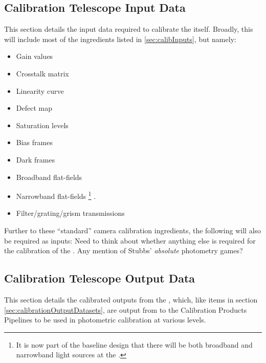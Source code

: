 

\subsection{Calibration Telescope Input Data}
\label{sec:calibrationTelescopeDatasets}
This section details the input data required to calibrate the \auxtelescope itself. Broadly, this will include most of the ingredients listed in \secsymbol\ref{sec:calibInputs}, but namely:

\begin{itemize}
	\item Gain values
	\item Crosstalk matrix
	\item Linearity curve
	\item Defect map
	\item Saturation levels
	\item Bias frames
	\item Dark frames
	\item Broadband flat-fields
	\item Narrowband flat-fields \footnote{It is now part of the baseline design that there will be both broadband and narrowband light sources at the \auxtelescope.} .
	\item Filter/grating/grism transmissions
\end{itemize}

Further to these ``standard'' camera calibration ingredients, the following will also be required as inputs:
\XXX{\xxx} Need to think about whether anything else is required for the calibration of the \auxtelescope. Any mention of Stubbs' \emph{absolute} photometry games?








\subsection{Calibration Telescope Output Data}
\label{sec:calibrationTelescopeDatasets}
This section details the calibrated outputs from the \auxtelescope, which, like items in section \secsymbol\ref{sec:calibrationOutputDatasets}, are output from to the Calibration Products Pipelines to be used in photometric calibration at various levels.


